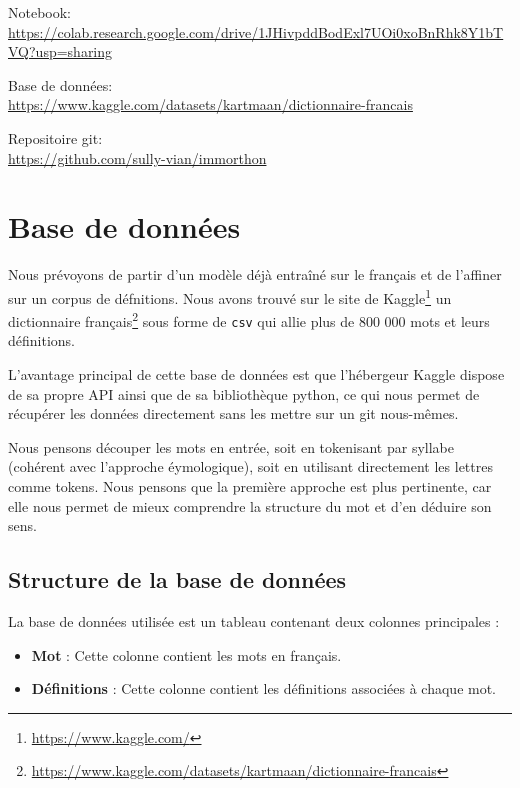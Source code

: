\documentclass[french]{template}
\begin{document}
Notebook: \\
\url{https://colab.research.google.com/drive/1JHivpddBodExl7UOi0xoBnRhk8Y1bTVQ?usp=sharing}

\vspace{\baselineskip}
Base de données: \\
\url{https://www.kaggle.com/datasets/kartmaan/dictionnaire-francais}

\vspace{\baselineskip}
Repositoire git: \\
\url{https://github.com/sully-vian/immorthon}

\section{Base de données}

Nous prévoyons de partir d'un modèle déjà entraîné sur le français et de l'affiner sur un corpus de défnitions. Nous avons trouvé sur le site de Kaggle\footnote{\url{https://www.kaggle.com/}} un dictionnaire français\footnote{\url{https://www.kaggle.com/datasets/kartmaan/dictionnaire-francais}} sous forme de \texttt{csv} qui allie plus de 800 000 mots et leurs définitions.

L'avantage principal de cette base de données est que l'hébergeur Kaggle dispose de sa propre API ainsi que de sa bibliothèque python, ce qui nous permet de récupérer les données directement sans les mettre sur un git nous-mêmes.

Nous pensons découper les mots en entrée, soit en tokenisant par syllabe (cohérent avec l'approche éymologique), soit en utilisant directement les lettres comme tokens. Nous pensons que la première approche est plus pertinente, car elle nous permet de mieux comprendre la structure du mot et d'en déduire son sens.

\subsection{Structure de la base de données}

La base de données utilisée est un tableau contenant deux colonnes principales :
\begin{itemize}
    \item \textbf{Mot} : Cette colonne contient les mots en français.
    \item \textbf{Définitions} : Cette colonne contient les définitions associées à chaque mot.
\end{itemize}
\end{document}
